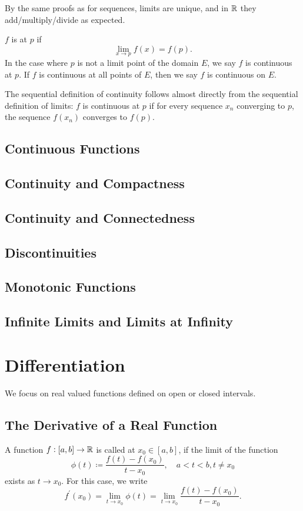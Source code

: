 By the same proofs as for sequences, limits are unique, and in $\mathbb R$ they add/multiply/divide as expected.

\begin{definition}
$f$ is  at $p$ if
\[ \lim_{x\to p}f(x) = f(p). \]
In the case where $p$ is not a limit point of the domain $E$, we say $f$ is continuous at $p$. If $f$ is continuous at all points of $E$, then we say $f$ is continuous on $E$.
\end{definition}

The sequential definition of continuity follows almost directly from the sequential definition of limits: 
$f$ is continuous at $p$ if for every sequence $x_n$ converging to $p$, the sequence $f(x_n)$ converges to $f(p)$.



\section{Continuous Functions}

\section{Continuity and Compactness}

\section{Continuity and Connectedness}

\section{Discontinuities}

\section{Monotonic Functions}

\section{Infinite Limits and Limits at Infinity}


\chapter{Differentiation}
We focus on real valued functions defined on open or closed intervals.

\section{The Derivative of a Real Function}
\begin{definition}
A function $f:[a,b]\to\mathbb R$ is called  at $x_0\in[a,b]$, if the limit of the function
\[ \phi(t)\coloneqq\frac{f(t)-f(x_0)}{t-x_0}, \quad a<t<b, t\neq x_0 \]
exists as $t\to x_0$. For this case, we write
\begin{equation}\label{eqn:derivative}
f^\prime(x_0)=\lim_{t\to x_0}\phi(t)=\lim_{t\to x_0}\frac{f(t)-f(x_0)}{t-x_0}.
\end{equation}
\end{definition}

